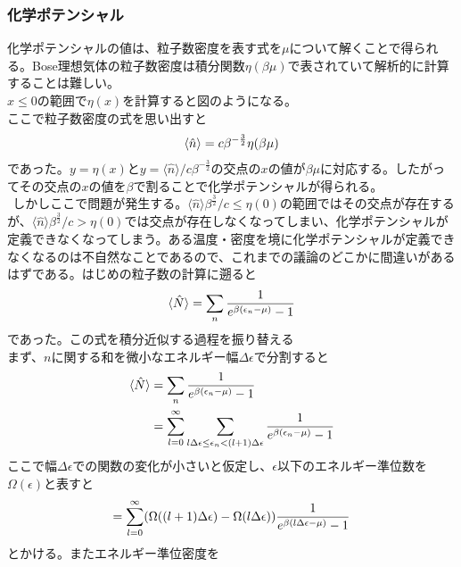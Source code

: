 \documentclass[dvipdfmx, 11pt, a4paper]{jsarticle}
\theoremstyle{definition}
\begin{document}
\subsubsection{化学ポテンシャル}
    化学ポテンシャルの値は、粒子数密度を表す式を$\mu$について解くことで得られる。Bose理想気体の粒子数密度は積分関数$\eta (\beta \mu)$で表されていて解析的に計算することは難しい。\\
    $x \le 0$の範囲で$\eta (x)$を計算すると図のようになる。\\ここで粒子数密度の式を思い出すと
    \begin{align}
        \langle \hat{n} \rangle = c \beta^{-\frac{3}{2}} \eta (\beta \mu) \notag 
    \end{align}
    であった。$y = \eta (x)$と$y = \langle \hat{n} \rangle / c \beta^{-\frac{3}{2}} $の交点の$x$の値が$\beta \mu$に対応する。したがってその交点の$x$の値を$\beta$で割ることで化学ポテンシャルが得られる。\\
    $\ \ $しかしここで問題が発生する。$\langle \hat{n} \rangle \beta^{\frac{3}{2}} / c\le \eta (0)$の範囲ではその交点が存在するが、$\langle \hat{n} \rangle \beta^{\frac{3}{2}}  / c  > \eta (0)$では交点が存在しなくなってしまい、化学ポテンシャルが定義できなくなってしまう。ある温度・密度を境に化学ポテンシャルが定義できなくなるのは不自然なことであるので、これまでの議論のどこかに間違いがあるはずである。はじめの粒子数の計算に遡ると
    \begin{align}
        \langle \hat{N} \rangle = \sum_n \frac{1}{e^{\beta (\epsilon_n - \mu)} - 1} \notag 
    \end{align}
    であった。この式を積分近似する過程を振り替える\\
    まず、$n$に関する和を微小なエネルギー幅$\Delta \epsilon$で分割すると
    \begin{align}
        \langle \hat{N} \rangle &= \sum_n \frac{1}{e^{\beta (\epsilon_n - \mu)} - 1} \notag \\
        &= \sum_{l=0}^{\infty} \sum_{l\Delta \epsilon \le \epsilon_n < (l+1)\Delta \epsilon} \frac{1}{e^{\beta (\epsilon_n - \mu)} - 1} \notag 
    \end{align}
    ここで幅$\Delta \epsilon$での関数の変化が小さいと仮定し、$\epsilon$以下のエネルギー準位数を$\Omega(\epsilon)$と表すと
    \begin{align}
        = \sum_{l=0}^{\infty} (\Omega((l+1)\Delta \epsilon) - \Omega(l \Delta \epsilon)) \frac{1}{e^{\beta (l\Delta \epsilon - \mu)} - 1} \notag 
    \end{align}
    とかける。またエネルギー準位密度を
\end{document}
